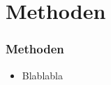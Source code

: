 \section{Methoden}

\begin{frame}
	\frametitle{Methoden}
	\begin{itemize}
		\item Blablabla
	\end{itemize}
\end{frame}
